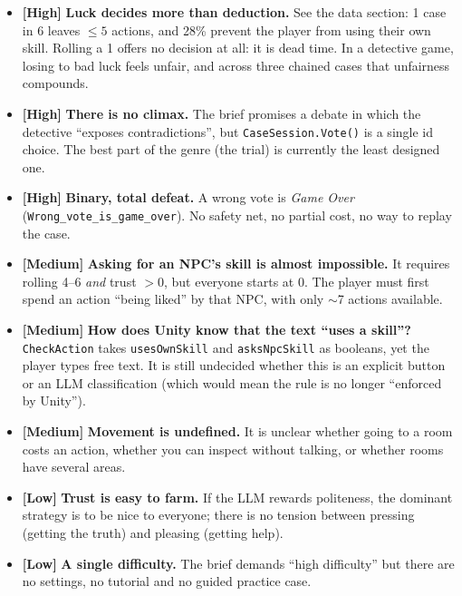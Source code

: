 \documentclass[11pt,a4paper]{article}
\newcommand{\file}[1]{\texttt{\small #1}}
\newcommand{\prio}[1]{\textbf{\color{neon}[#1]}}
\begin{document}
\begin{debil}
\begin{itemize}
\item \prio{High} \textbf{Luck decides more than deduction.} See the data section: 1 case in 6 leaves
$\leq 5$ actions, and 28\% prevent the player from using their own skill. Rolling a 1 offers no
decision at all: it is dead time. In a detective game, losing to bad luck feels unfair, and across
three chained cases that unfairness compounds.
\item \prio{High} \textbf{There is no climax.} The brief promises a debate in which the detective
``exposes contradictions'', but \file{CaseSession.Vote()} is a single id choice. The best part of the
genre (the trial) is currently the least designed one.
\item \prio{High} \textbf{Binary, total defeat.} A wrong vote is \emph{Game Over}
(\file{Wrong\_vote\_is\_game\_over}). No safety net, no partial cost, no way to replay the case.
\item \prio{Medium} \textbf{Asking for an NPC's skill is almost impossible.} It requires rolling 4--6
\emph{and} trust $>0$, but everyone starts at 0. The player must first spend an action ``being
liked'' by that NPC, with only $\sim$7 actions available.
\item \prio{Medium} \textbf{How does Unity know that the text ``uses a skill''?} \file{CheckAction}
takes \texttt{usesOwnSkill} and \texttt{asksNpcSkill} as booleans, yet the player types free text. It
is still undecided whether this is an explicit button or an LLM classification (which would mean
the rule is no longer ``enforced by Unity'').
\item \prio{Medium} \textbf{Movement is undefined.} It is unclear whether going to a room costs an
action, whether you can inspect without talking, or whether rooms have several areas.
\item \prio{Low} \textbf{Trust is easy to farm.} If the LLM rewards politeness, the dominant strategy
is to be nice to everyone; there is no tension between pressing (getting the truth) and pleasing
(getting help).
\item \prio{Low} \textbf{A single difficulty.} The brief demands ``high difficulty'' but there are no
settings, no tutorial and no guided practice case.
\end{itemize}
\end{debil}
\end{document}
